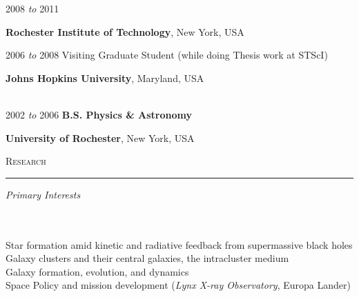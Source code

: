 \documentclass[11pt]{article}
\makeatletter
\def\vhrulefill#1{\leavevmode\leaders\hrule\@height#1\hfill \kern\z@}
\makeatother
\begin{document}
\hspace{2.5mm}2008 \textit{to} 2011 

\hspace{42mm}\parbox{5.15in}{\textbf{Rochester Institute of Technology}, New York, USA \\}





\hspace{2.5mm}2006 \textit{to} 2008  \hspace{18mm} Visiting Graduate Student (while doing Thesis work at STScI)

\hspace{42mm} \parbox{5.15in}{\textbf{Johns Hopkins University}, Maryland, USA} \\



\hspace{2.5mm} 2002 \textit{to} 2006 \hspace{17mm} {\textbf{B.S. Physics \& Astronomy}}

\hspace{42mm} \parbox{5.15in}{\textbf{University of Rochester}, New York, USA}



\textsc{Research}  \vhrulefill{0.4pt}

\vspace{2mm}

\hspace{2.5mm} \parbox{1.5in}{\textit{Primary Interests \\\\\\}} \parbox{5.15in}{Star formation amid kinetic and radiative feedback from supermassive black holes \\ Galaxy clusters and their central galaxies, the intracluster medium \\ Galaxy formation, evolution, and dynamics \\ Space Policy and mission development (\textit{Lynx X-ray Observatory}, Europa Lander)} \\
\end{document}
